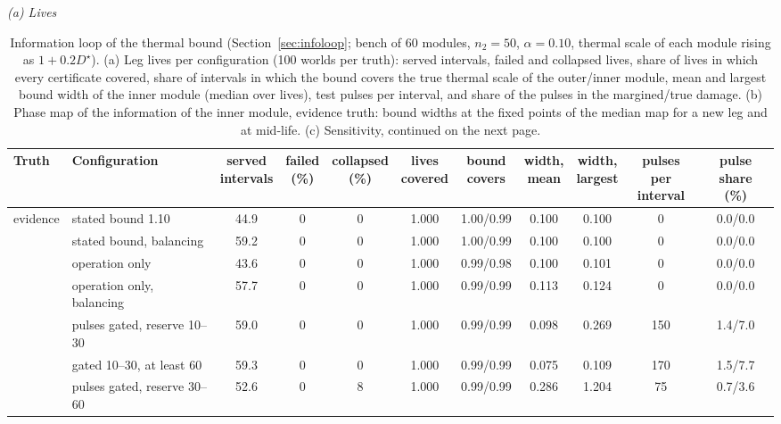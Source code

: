 \begin{table}[htbp]
\centering
\caption{Information loop of the thermal bound (Section~\ref{sec:infoloop}; bench of 60 modules, $n_2=50$,
$\alpha=0.10$, thermal scale of each module rising as $1+0.2D^\star$). (a) Leg lives per configuration (100 worlds per
truth): served intervals, failed and collapsed lives, share of lives in which every certificate covered, share of
intervals in which the bound covers the true thermal scale of the outer/inner module, mean and largest bound width of
the inner module (median over lives), test pulses per interval, and share of the pulses in the margined/true damage.
(b) Phase map of the information of the inner module, evidence truth: bound widths at the fixed points of the median map
for a new leg and at mid-life. (c) Sensitivity, continued on the next page.}
\label{tab:S9}
\scriptsize
\setlength{\tabcolsep}{2.5pt}
\textit{(a) Lives}\\[2pt]
\begin{tabular*}{\textwidth}{@{\extracolsep{\fill}}llccccccccc@{}}
\toprule
Truth & Configuration & \makecell{served\\intervals} & \makecell{failed\\(\%)} & \makecell{collapsed\\(\%)} &
\makecell{lives\\covered} & \makecell{bound\\covers} & \makecell{width,\\mean} & \makecell{width,\\largest} &
\makecell{pulses per\\interval} & \makecell{pulse share\\(\%)} \\
\midrule
evidence & stated bound 1.10 & 44.9 & 0 & 0 & 1.000 & 1.00/0.99 & 0.100 & 0.100 & 0 & 0.0/0.0 \\
 & stated bound, balancing & 59.2 & 0 & 0 & 1.000 & 1.00/0.99 & 0.100 & 0.100 & 0 & 0.0/0.0 \\
 & operation only & 43.6 & 0 & 0 & 1.000 & 0.99/0.98 & 0.100 & 0.101 & 0 & 0.0/0.0 \\
 & operation only, balancing & 57.7 & 0 & 0 & 1.000 & 0.99/0.99 & 0.113 & 0.124 & 0 & 0.0/0.0 \\
 & pulses gated, reserve 10--30 & 59.0 & 0 & 0 & 1.000 & 0.99/0.99 & 0.098 & 0.269 & 150 & 1.4/7.0 \\
 & gated 10--30, at least 60 & 59.3 & 0 & 0 & 1.000 & 0.99/0.99 & 0.075 & 0.109 & 170 & 1.5/7.7 \\
 & pulses gated, reserve 30--60 & 52.6 & 0 & 8 & 1.000 & 0.99/0.99 & 0.286 & 1.204 & 75 & 0.7/3.6 \\

\end{tabular*}
\end{table}
